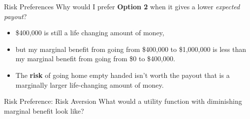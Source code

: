 
\begin{frame}{Risk Preferences}
  Why would I prefer \textbf{Option 2} when it gives a lower \textit{expected payout}? 
  \begin{itemize}
    \item \$400,000 is still a life changing amount of money, 
    \item but my \alert{marginal benefit} from going from \$400,000 to \$1,000,000 
    is less than my \alert{marginal benefit} from going from \$0 to \$400,000.
    \item The \textbf{risk} of going home empty handed isn't worth the 
    payout that is a marginally larger life-changing amount of money.
  \end{itemize}
\end{frame}


\begin{frame}{Risk Preference: Risk Aversion}
  What would a utility function with \alert{diminishing marginal benefit} 
  look like?
  \vspace{50mm}
\end{frame}


